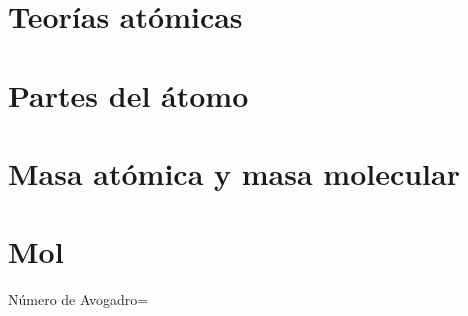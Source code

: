 


\section{Teorías atómicas}



\section{Partes del átomo}



\section{Masa atómica y masa molecular}



\section{Mol}

Número de Avogadro=

